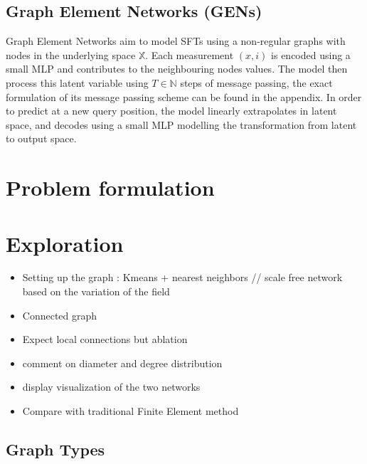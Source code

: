 \documentclass[a4paper,10pt]{article}
\newcommand{\ap}[1]{\marginpar{{\tiny \color{red} [AP] #1}}}
\begin{document}
\subsection{Graph Element Networks (GENs)} \label{ssec:gen}
Graph Element Networks \cite{alet2019gen} aim to model SFTs using a non-regular graphs with nodes in the underlying space $\mathbb{X}$. Each measurement $(x, i)$ is encoded using a small MLP and contributes to the neighbouring nodes values. The model then process this latent variable using $T \in \mathbb{N}$ steps of message passing, the exact formulation of its message passing scheme can be found in the appendix.
In order to predict at a new query position, the model linearly extrapolates in latent space, and decodes using a small MLP modelling the transformation from latent to output space.
\ap{advantages -- drawbacks}

\section{Problem formulation}

\section{Exploration}

\begin{itemize}
  \item Setting up the graph : Kmeans + nearest neighbors // scale free network based on the variation of the field
  \item Connected graph
  \item Expect local connections but ablation
  \item comment on diameter and degree distribution
  \item display visualization of the two networks
  \item Compare with traditional Finite Element method
\end{itemize}

\subsection{Graph Types}
\end{document}
